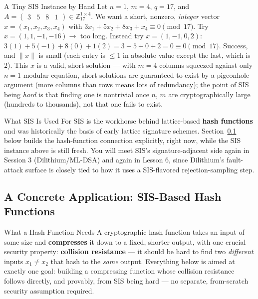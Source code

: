 \begin{exbox}{A Tiny SIS Instance by Hand}
Let $n=1$, $m=4$, $q=17$, and $A = \begin{pmatrix}3 & 5 & 8 & 1\end{pmatrix} \in \mathbb{Z}_{17}^{1\times 4}$. We want a short, nonzero, \emph{integer} vector $x = (x_1,x_2,x_3,x_4)$ with $3x_1 + 5x_2 + 8x_3 + x_4 \equiv 0 \pmod{17}$. Try $x = (1,1,-1,-16) \to$ too long. Instead try $x = (1,-1,0,2)$: $3(1) + 5(-1) + 8(0) + 1(2) = 3 - 5 + 0 + 2 = 0 \equiv 0 \pmod{17}$. Success, and $\|x\|$ is small (each entry is $\le 1$ in absolute value except the last, which is $2$). This $x$ is a valid, short solution --- with $m=4$ columns squeezed against only $n=1$ modular equation, short solutions are guaranteed to exist by a pigeonhole argument (more columns than rows means lots of redundancy); the point of SIS being \emph{hard} is that finding one is nontrivial once $n$, $m$ are cryptographically large (hundreds to thousands), not that one fails to exist.
\end{exbox}

\begin{rmkbox}{What SIS Is Used For}
SIS is the workhorse behind lattice-based \textbf{hash functions} and was historically the basis of early lattice signature schemes. Section~\ref{sec:L2:a-concrete-application-sis-based-hash-fu} below builds the hash-function connection explicitly, right now, while the SIS instance above is still fresh. You will meet SIS's signature-adjacent side again in Session 3 (Dilithium/ML-DSA) and again in Lesson 6, since Dilithium's fault-attack surface is closely tied to how it uses a SIS-flavored rejection-sampling step.
\end{rmkbox}

\subsection{A Concrete Application: SIS-Based Hash Functions}
\label{sec:L2:a-concrete-application-sis-based-hash-fu}

\begin{rmkbox}{What a Hash Function Needs}
A cryptographic hash function takes an input of some size and \textbf{compresses} it down to a fixed, shorter output, with one crucial security property: \textbf{collision resistance} --- it should be hard to find two \emph{different} inputs $x_1 \ne x_2$ that hash to the \emph{same} output. Everything below is aimed at exactly one goal: building a compressing function whose collision resistance follows directly, and provably, from SIS being hard --- no separate, from-scratch security assumption required.
\end{rmkbox}

